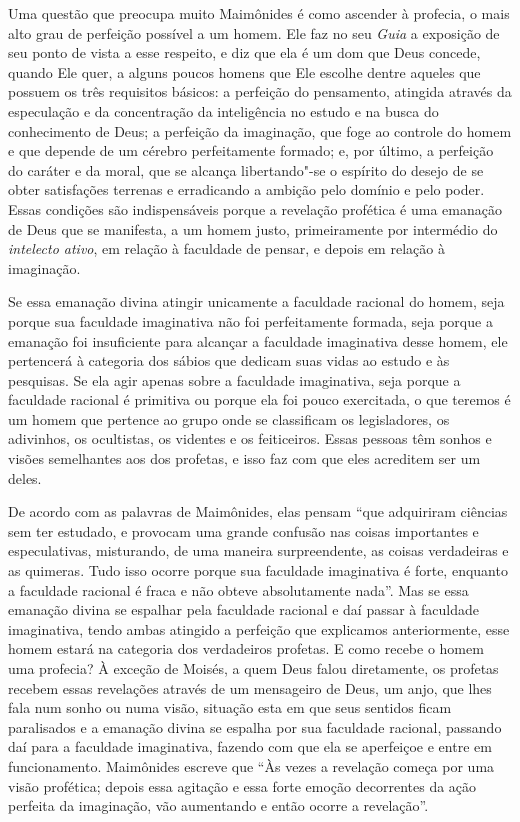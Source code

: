 Uma questão que preocupa muito Maimônides é como ascender à profecia, o
mais alto grau de perfeição possível a um homem. Ele faz no seu
\emph{Guia} a exposição de seu ponto de vista a esse respeito, e diz que
ela é um dom que Deus concede, quando Ele quer, a alguns poucos homens
que Ele escolhe dentre aqueles que possuem os três requisitos básicos: a
perfeição do pensamento, atingida através da especulação e da
concentração da inteligência no estudo e na busca do conhecimento de
Deus; a perfeição da imaginação, que foge ao controle do homem e que
depende de um cérebro perfeitamente formado; e, por último, a perfeição
do caráter e da moral, que se alcança libertando"-se o espírito do desejo
de se obter satisfações terrenas e erradicando a ambição pelo domínio e
pelo poder. Essas condições são indispensáveis porque a revelação
profética é uma emanação de Deus que se manifesta, a um homem justo,
primeiramente por intermédio do \emph{intelecto ativo}, em relação à
faculdade de pensar, e depois em relação à imaginação.

Se essa emanação divina atingir unicamente a faculdade racional do
homem, seja porque sua faculdade imaginativa não foi perfeitamente
formada, seja porque a emanação foi insuficiente para alcançar a
faculdade imaginativa desse homem, ele pertencerá à categoria dos sábios
que dedicam suas vidas ao estudo e às pesquisas. Se ela agir apenas
sobre a faculdade imaginativa, seja porque a faculdade racional é
primitiva ou porque ela foi pouco exercitada, o que teremos é um homem
que pertence ao grupo onde se classificam os legisladores, os
adivinhos, os ocultistas, os videntes e os feiticeiros. Essas pessoas
têm sonhos e visões semelhantes aos dos profetas, e isso faz com que
eles acreditem ser um deles. 

De acordo com as palavras de Maimônides,
elas pensam ``que adquiriram ciências sem ter estudado, e provocam uma
grande confusão nas coisas importantes e especulativas, misturando, de
uma maneira surpreendente, as coisas verdadeiras e as quimeras. Tudo
isso ocorre porque sua faculdade imaginativa é forte, enquanto a
faculdade racional é fraca e não obteve absolutamente nada''. Mas se
essa emanação divina se espalhar pela faculdade racional e daí passar à
faculdade imaginativa, tendo ambas atingido a perfeição que explicamos
anteriormente, esse homem estará na categoria dos verdadeiros
profetas. E como recebe o homem uma profecia? À exceção de Moisés, a
quem Deus falou diretamente, os profetas recebem essas revelações através de
um mensageiro de Deus, um anjo, que lhes fala num sonho ou numa visão,
situação esta em que seus sentidos ficam paralisados e a emanação
divina se espalha por sua faculdade racional, passando daí para a
faculdade imaginativa, fazendo com que ela se aperfeiçoe e entre em
funcionamento. Maimônides escreve que ``Às vezes a revelação começa por
uma visão profética; depois essa agitação e essa forte emoção
decorrentes da ação perfeita da imaginação, vão aumentando e então
ocorre a revelação''.


